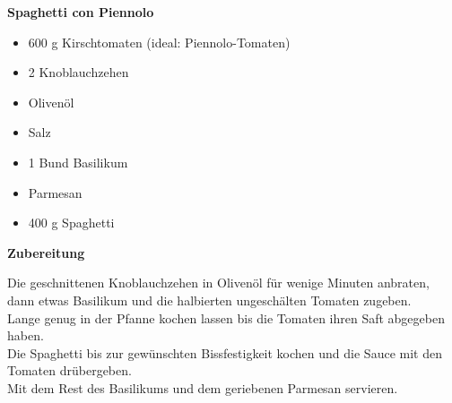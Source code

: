 
\parindent0pt	

\pagestyle{empty}


\textbf{{\LARGE Spaghetti con Piennolo}}%


\hrulefill
\vspace*{\fill}
\begin{multicols}{2}	


\begin{itemize}
\item 600 g Kirschtomaten (ideal: Piennolo-Tomaten)
\item 2 Knoblauchzehen
\item Olivenöl
\item Salz
\item 1 Bund Basilikum
\item Parmesan
\item 400 g Spaghetti
\end{itemize}

\end{multicols}
\vfill
\newpage
\textbf{{\LARGE Zubereitung}}%

\hrulefill

\vspace*{\fill}
\begin{multicols}{2}


Die geschnittenen Knoblauchzehen in Olivenöl für wenige Minuten anbraten, 
dann etwas Basilikum und die halbierten ungeschälten Tomaten zugeben.\\
Lange genug in der Pfanne kochen lassen bis die Tomaten ihren Saft abgegeben haben.\\
Die Spaghetti bis zur gewünschten Bissfestigkeit kochen und die Sauce mit den Tomaten drübergeben.\\ 

Mit dem Rest des Basilikums und dem geriebenen Parmesan servieren. 



\end{multicols}
\vfill
